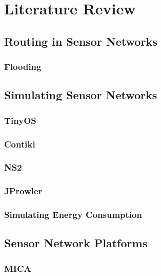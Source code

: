 \section{Literature Review}

\subsection{Routing in Sensor Networks}

\subsubsection{Flooding}



\subsection{Simulating Sensor Networks}

\subsubsection{TinyOS}

\subsubsection{Contiki}

\subsubsection{NS2}

\subsubsection{JProwler}

\subsubsection{Simulating Energy Consumption}
\cite{Shnayder04}


\subsection{Sensor Network Platforms}

\subsubsection{MICA}
\cite{Mica2002}

